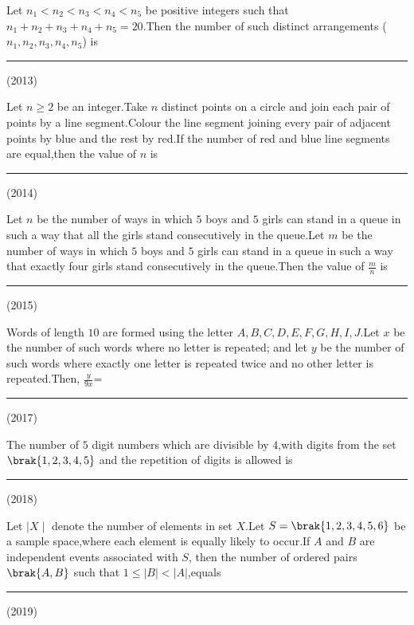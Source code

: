 \iffalse
\title{Assignment}
\author{Banapuram Pranay Kumar}
\section{integer}
\fi




\item Let $n_1<n_2<n_3<n_4<n_5$ be positive integers such that $n_1+n_2+n_3+n_4+n_5=20$.Then the number of such distinct arrangements ($n_1,n_2,n_3,n_4,n_5$) is \rule{1cm}{0.15mm}
\hfill(2013) \\

\item Let $n\ge2$ be an integer.Take $n$ distinct points on a circle and join each pair of points by a line segment.Colour the line segment joining every pair of adjacent points by blue and the rest by red.If the number of red and blue line segments are equal,then the value of $n$ is \rule{1cm}{0.15mm}
\hfill(2014)\\

\item Let $n$ be the number of ways in which $5$ boys and $5$ girls can stand in a queue in such a way that all the girls stand consecutively in the queue.Let $m$ be the number of ways in which $5$ boys and $5$ girls can stand in a queue in such a way that exactly four girls stand consecutively in the queue.Then the value of $\frac{m}{n}$ is \rule{1cm}{0.15mm}
\hfill(2015)\\

\item Words of length $10$ are formed using the letter $A,B,C,D,E,F,G,H,I,J$.Let $x$ be the number of such words where no letter is repeated; and let $y$ be the number of such words where exactly one letter is repeated twice and no other letter is repeated.Then, $\frac{y}{9x}$= \rule{1cm}{0.15mm} 
\hfill(2017)\\

\item The number of $5$ digit numbers which are divisible by $4$,with digits from the set $\brak{1,2,3,4,5}$ and the repetition of digits is allowed is \rule{1cm}{0.15mm}
\hfill (2018)\\

\item Let $\mid X \mid $ denote the number of elements in set $X$.Let $S=\brak{1,2,3,4,5,6}$ be a sample space,where each element is equally likely to occur.If $A$ and $B$ are independent events associated with $S$, then the number of ordered pairs $\brak{A,B}$ such that $1\leq|B|<|A|$,equals \rule{1cm}{0.15mm}
\hfill (2019)\\

